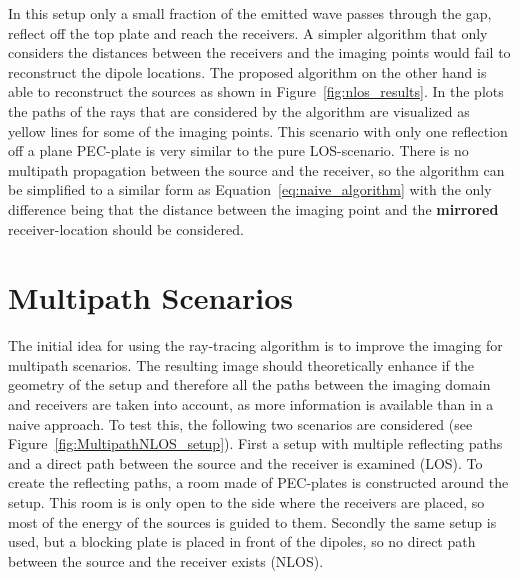 In this setup only a small fraction of the emitted wave passes through the gap, reflect off the top plate and reach the receivers.
A simpler algorithm that only considers the distances between the receivers and the imaging points would fail to reconstruct the dipole locations.
The proposed algorithm on the other hand is able to reconstruct the sources as shown in Figure~\ref{fig:nlos_results}.
In the plots the paths of the rays that are considered by the algorithm are visualized as yellow lines for some of the imaging points.
This scenario with only one reflection off a plane PEC-plate is very similar to the pure LOS-scenario.
There is no multipath propagation between the source and the receiver, so the algorithm can be simplified to a similar form as Equation~\eqref{eq:naive_algorithm} with the only difference being that the distance between the imaging point and the \textbf{mirrored} receiver-location should be considered.



\section{Multipath Scenarios}
The initial idea for using the ray-tracing algorithm is to improve the imaging for multipath scenarios.
The resulting image should theoretically enhance if the geometry of the setup and therefore all the paths between the imaging domain and receivers are taken into account, as more information is available than in a naive approach.
To test this, the following two scenarios are considered (see Figure~\ref{fig:MultipathNLOS_setup}).
First a setup with multiple reflecting paths and a direct path between the source and the receiver is examined (LOS).
To create the reflecting paths, a room made of PEC-plates is constructed around the setup.
This room is is only open to the side where the receivers are placed, so most of the energy of the sources is guided to them.
Secondly the same setup is used, but a blocking plate is placed in front of the dipoles, so no direct path between the source and the receiver exists (NLOS).


